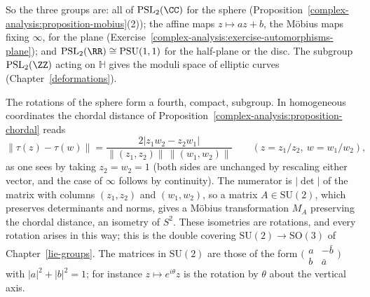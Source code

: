 So the three groups are: all of $\mathrm{PSL}_2(\CC)$ for the sphere (Proposition~\ref{complex-analysis:proposition-mobius}(2)); the affine maps $z \mapsto az + b$, the M\"obius maps fixing $\infty$, for the plane
(Exercise~\ref{complex-analysis:exercise-automorphisms-plane}); and $\mathrm{PSL}_2(\RR) \cong \mathrm{PSU}(1, 1)$ for the half-plane or the disc. The subgroup $\mathrm{PSL}_2(\ZZ)$ acting on $\mathbb{H}$ gives the moduli
space of elliptic curves (Chapter~\ref{deformations}).

The rotations of the sphere form a fourth, compact, subgroup. In homogeneous coordinates the chordal distance of Proposition~\ref{complex-analysis:proposition-chordal} reads
\[
\|\tau(z) - \tau(w)\| = \frac{2|z_1w_2 - z_2w_1|}{\|(z_1, z_2)\|\,\|(w_1, w_2)\|} \qquad (z = z_1/z_2, \ w = w_1/w_2),
\]
as one sees by taking $z_2 = w_2 = 1$ (both sides are unchanged by rescaling either vector, and the case of $\infty$ follows by continuity). The numerator is $|\det|$ of the matrix with columns $(z_1, z_2)$ and
$(w_1, w_2)$, so a matrix $A \in \mathrm{SU}(2)$, which preserves determinants and norms, gives a M\"obius transformation $M_A$ preserving the chordal distance, an isometry of $S^2$. These isometries are rotations, and
every rotation arises in this way; this is the double covering $\mathrm{SU}(2) \to \mathrm{SO}(3)$ of Chapter~\ref{lie-groups}. The matrices in $\mathrm{SU}(2)$ are those of the form
$\bigl(\begin{smallmatrix}a & -\bar b\\ b & \bar a\end{smallmatrix}\bigr)$ with $|a|^2 + |b|^2 = 1$; for instance $z \mapsto e^{i\theta}z$ is the rotation by $\theta$ about the vertical axis.

